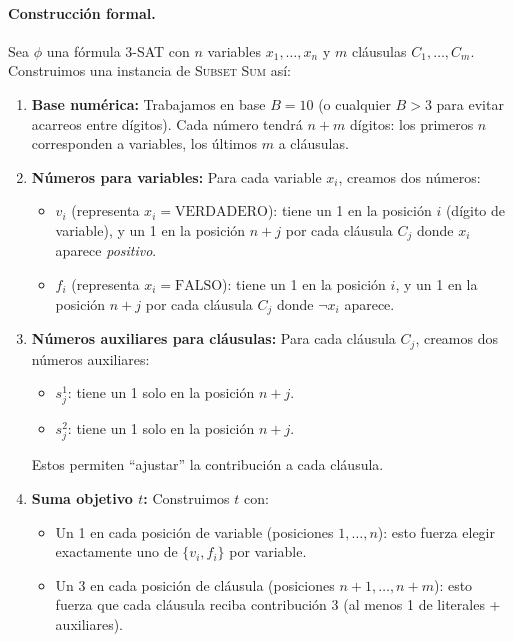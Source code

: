 \documentclass[11pt]{article}
\begin{document}
\paragraph{Construcción formal.} Sea $\phi$ una fórmula 3-SAT con $n$ variables $x_1,\dots,x_n$ y $m$ cláusulas $C_1,\dots,C_m$. Construimos una instancia de \textsc{Subset Sum} así:

\begin{enumerate}
  \item \textbf{Base numérica:} Trabajamos en base $B=10$ (o cualquier $B>3$ para evitar acarreos entre dígitos). Cada número tendrá $n+m$ dígitos: los primeros $n$ corresponden a variables, los últimos $m$ a cláusulas.
  
  \item \textbf{Números para variables:} Para cada variable $x_i$, creamos dos números:
  \begin{itemize}
    \item $v_i$ (representa $x_i = \text{VERDADERO}$): tiene un 1 en la posición $i$ (dígito de variable), y un 1 en la posición $n+j$ por cada cláusula $C_j$ donde $x_i$ aparece \emph{positivo}.
    \item $f_i$ (representa $x_i = \text{FALSO}$): tiene un 1 en la posición $i$, y un 1 en la posición $n+j$ por cada cláusula $C_j$ donde $\neg x_i$ aparece.
  \end{itemize}
  
  \item \textbf{Números auxiliares para cláusulas:} Para cada cláusula $C_j$, creamos dos números auxiliares:
  \begin{itemize}
    \item $s_j^1$: tiene un 1 solo en la posición $n+j$.
    \item $s_j^2$: tiene un 1 solo en la posición $n+j$.
  \end{itemize}
  Estos permiten ``ajustar'' la contribución a cada cláusula.
  
  \item \textbf{Suma objetivo $t$:} Construimos $t$ con:
  \begin{itemize}
    \item Un 1 en cada posición de variable (posiciones $1,\dots,n$): esto fuerza elegir exactamente uno de $\{v_i, f_i\}$ por variable.
    \item Un 3 en cada posición de cláusula (posiciones $n+1,\dots,n+m$): esto fuerza que cada cláusula reciba contribución 3 (al menos 1 de literales + auxiliares).
  \end{itemize}
\end{enumerate}
\end{document}
